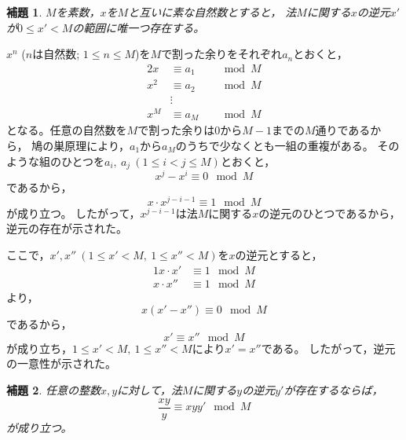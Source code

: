 \documentclass{article}
\makeatletter
\renewenvironment{proof}[1][\proofname]{\par
        \pushQED{\qed}
        \normalfont
        \topsep6\p@\@plus6\p@ \trivlist
        \item[\hskip\labelsep{\bfseries #1}\@addpunct{\bfseries}]\ignorespaces
    }{%
        \popQED\endtrivlist\@endpefalse
    }
\renewcommand{\proofname}{証明.}
\newtheorem{lemma}{補題}
\makeatother
\begin{document}
\begin{screen}
    \begin{lemma}
        \label{lemma:inv:1}
        $M$を素数，$x$を$M$と互いに素な自然数とすると，
        法$M$に関する$x$の逆元$x'$が$0 \leq x' < M$の範囲に唯一つ存在する。
    \end{lemma}
\end{screen}

\begin{proof}
    $x^n$ ($n$は自然数; $1 \leq n \leq M$)を$M$で割った余りをそれぞれ$a_n$とおくと，
    \begin{alignat}{2}
        x   &\equiv a_1   & &\mod{M} \\
        x^2 &\equiv a_2 & &\mod{M} \\
            &\vdots& & \\
        x^M &\equiv a_M & &\mod{M}
    \end{alignat}
    となる。任意の自然数を$M$で割った余りは0から$M - 1$までの$M$通りであるから，
    鳩の巣原理により，$a_1$から$a_M$のうちで少なくとも一組の重複がある。
    そのような組のひとつを$a_i,\ a_j\ (1 \leq i < j \leq M)$とおくと，
    \begin{equation}
        x^j - x^i \equiv 0 \mod{M}
    \end{equation}
    であるから，
    \begin{equation}
        x \cdot x^{j - i - 1} \equiv 1 \mod{M}
    \end{equation}
    が成り立つ。
    したがって，$x^{j - i - 1}$は法$M$に関する$x$の逆元のひとつであるから，逆元の存在が示された。

    ここで，$x', x''\ (1 \leq x' < M,\ 1 \leq x'' < M)$を$x$の逆元とすると，
    \begin{alignat}{1}
        x \cdot x'  &\equiv 1 \mod{M} \\
        x \cdot x'' &\equiv 1 \mod{M}
    \end{alignat}
    より，
    \begin{equation}
        x (x' - x'') \equiv 0 \mod{M}
    \end{equation}
    であるから，
    \begin{equation}
        x' \equiv x'' \mod{M}
    \end{equation}
    が成り立ち，$1 \leq x' < M,\ 1 \leq x'' < M$により$x' = x''$である。
    したがって，逆元の一意性が示された。
\end{proof}

\begin{screen}
    \begin{lemma}
        \label{lemma:inv:2}
        任意の整数$x, y$に対して，法$M$に関する$y$の逆元$y'$が存在するならば，
        \begin{equation}
            \frac{xy}{y} \equiv xyy' \mod{M}
        \end{equation}
        が成り立つ。
    \end{lemma}
\end{screen}
\end{document}
